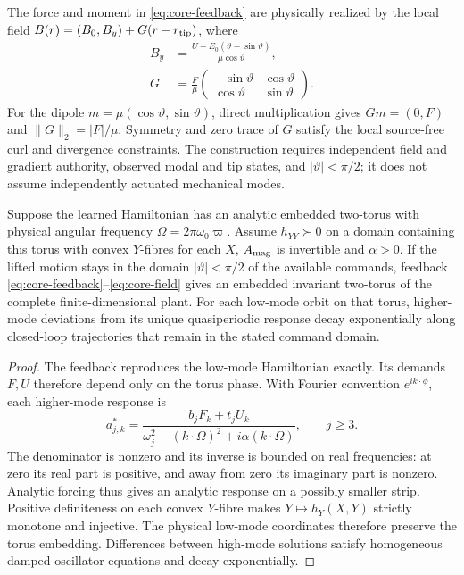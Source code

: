 The force and moment in \eqref{eq:core-feedback} are physically realized by the local field $B(r)=(B_0,B_y)+G(r-r_{\rm tip})$, where
\begin{equation}
\begin{aligned}
 B_y&=\frac{U-E_0(\vartheta-\sin\vartheta)}{\mu\cos\vartheta},\\
 G&=\frac F\mu
 \begin{pmatrix}-\sin\vartheta&\cos\vartheta\\
                 \cos\vartheta&\sin\vartheta\end{pmatrix}.
\end{aligned}
\label{eq:core-field}
\end{equation}
For the dipole $m=\mu(\cos\vartheta,\sin\vartheta)$, direct multiplication gives $Gm=(0,F)$ and $\|G\|_2=|F|/\mu$. Symmetry and zero trace of $G$ satisfy the local source-free curl and divergence constraints. The construction requires independent field and gradient authority, observed modal and tip states, and $|\vartheta|<\pi/2$; it does not assume independently actuated mechanical modes.

\begin{theorem}
\label{thm:core-lift}
Suppose the learned Hamiltonian has an analytic embedded two-torus with physical angular frequency $\Omega=2\pi\omega_0\varpi$. Assume $h_{YY}\succ0$ on a domain containing this torus with convex $Y$-fibres for each $X$, $A_{\rm mag}$ is invertible and $\alpha>0$. If the lifted motion stays in the domain $|\vartheta|<\pi/2$ of the available commands, feedback \eqref{eq:core-feedback}--\eqref{eq:core-field} gives an embedded invariant two-torus of the complete finite-dimensional plant. For each low-mode orbit on that torus, higher-mode deviations from its unique quasiperiodic response decay exponentially along closed-loop trajectories that remain in the stated command domain.
\end{theorem}
\begin{proof}
The feedback reproduces the low-mode Hamiltonian exactly. Its demands $F,U$ therefore depend only on the torus phase. With Fourier convention $e^{ik\cdot\phi}$, each higher-mode response is
\begin{equation}
 a^*_{j,k}=\frac{b_jF_k+t_jU_k}
 {\omega_j^2-(k\cdot\Omega)^2+i\alpha(k\cdot\Omega)},\qquad j\geq3.
\label{eq:core-lift-response}
\end{equation}
The denominator is nonzero and its inverse is bounded on real frequencies: at zero its real part is positive, and away from zero its imaginary part is nonzero. Analytic forcing thus gives an analytic response on a possibly smaller strip. Positive definiteness on each convex $Y$-fibre makes $Y\mapsto h_Y(X,Y)$ strictly monotone and injective. The physical low-mode coordinates therefore preserve the torus embedding. Differences between high-mode solutions satisfy homogeneous damped oscillator equations and decay exponentially.
\end{proof}


